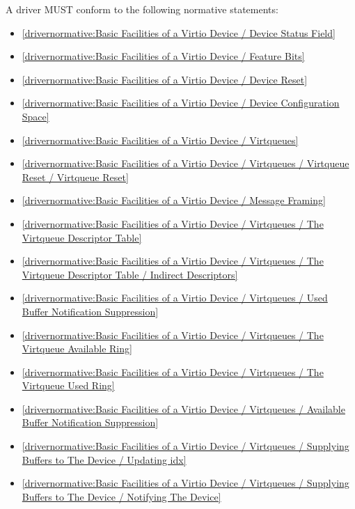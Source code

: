 \label{sec:Conformance / Driver Conformance}

A driver MUST conform to the following normative statements:

\begin{itemize}
\item \ref{drivernormative:Basic Facilities of a Virtio Device / Device Status Field}
\item \ref{drivernormative:Basic Facilities of a Virtio Device / Feature Bits}
\item \ref{drivernormative:Basic Facilities of a Virtio Device / Device Reset}
\item \ref{drivernormative:Basic Facilities of a Virtio Device / Device Configuration Space}
\item \ref{drivernormative:Basic Facilities of a Virtio Device / Virtqueues}
\item \ref{drivernormative:Basic Facilities of a Virtio Device / Virtqueues / Virtqueue Reset / Virtqueue Reset}
\item \ref{drivernormative:Basic Facilities of a Virtio Device / Message Framing}
\item \ref{drivernormative:Basic Facilities of a Virtio Device / Virtqueues / The Virtqueue Descriptor Table}
\item \ref{drivernormative:Basic Facilities of a Virtio Device / Virtqueues / The Virtqueue Descriptor Table / Indirect Descriptors}
\item \ref{drivernormative:Basic Facilities of a Virtio Device / Virtqueues / Used Buffer Notification Suppression}
\item \ref{drivernormative:Basic Facilities of a Virtio Device / Virtqueues / The Virtqueue Available Ring}
\item \ref{drivernormative:Basic Facilities of a Virtio Device / Virtqueues / The Virtqueue Used Ring}
\item \ref{drivernormative:Basic Facilities of a Virtio Device / Virtqueues / Available Buffer Notification Suppression}
\item \ref{drivernormative:Basic Facilities of a Virtio Device / Virtqueues / Supplying Buffers to The Device / Updating idx}
\item \ref{drivernormative:Basic Facilities of a Virtio Device / Virtqueues / Supplying Buffers to The Device / Notifying The Device}

\end{itemize}
